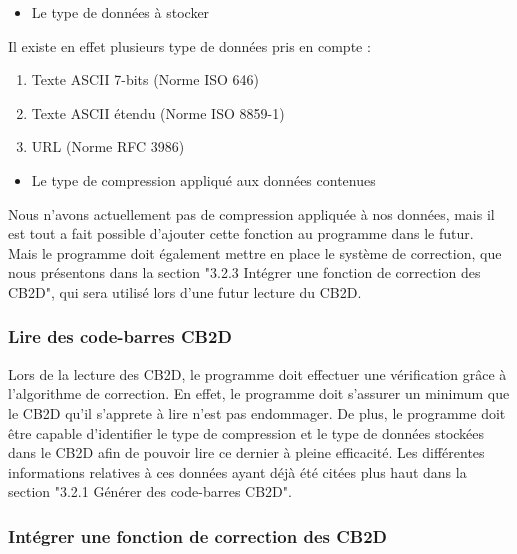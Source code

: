 \begin{itemize}
\item Le type de données à stocker
\end{itemize}
Il existe en effet plusieurs type de données pris en compte : 

	\begin{enumerate}
	\item Texte ASCII 7-bits (Norme ISO 646)
	\item Texte ASCII étendu (Norme ISO 8859-1)
	\item URL (Norme RFC 3986)
	\end{enumerate}

\begin{itemize}
\item Le type de compression appliqué aux données contenues
\end{itemize}

Nous n'avons actuellement pas de compression appliquée à nos données, mais il est tout a fait possible d'ajouter cette fonction au programme dans le futur. \\

Mais le programme doit également mettre en place le système de correction, que nous présentons dans la section "3.2.3 Intégrer une fonction de correction des CB2D", qui sera utilisé lors d'une futur lecture du CB2D.

\subsubsection{Lire des code-barres CB2D}

Lors de la lecture des CB2D, le programme doit effectuer une vérification grâce à l'algorithme de correction. En effet, le programme doit s'assurer un minimum que le CB2D qu'il s'apprete à lire n'est pas endommager.
De plus, le programme doit être capable d'identifier le type de compression et le type de données stockées dans le CB2D afin de pouvoir lire ce dernier à pleine efficacité. Les différentes informations relatives à ces données ayant déjà été citées plus haut dans la section "3.2.1 Générer des code-barres CB2D".

\subsubsection{Intégrer une fonction de correction des CB2D}

